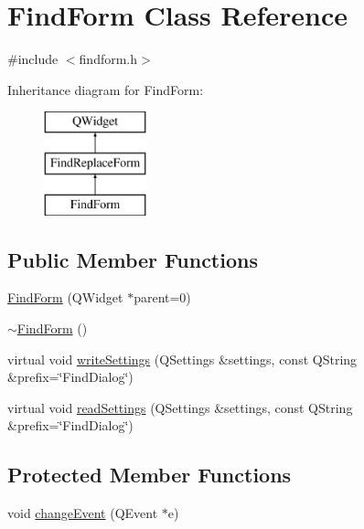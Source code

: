 \hypertarget{class_find_form}{}\section{Find\+Form Class Reference}
\label{class_find_form}


{\ttfamily \#include $<$findform.\+h$>$}

Inheritance diagram for Find\+Form\+:\begin{figure}[H]
\begin{center}
\leavevmode
\includegraphics[height=3.000000cm]{class_find_form}
\end{center}
\end{figure}
\subsection*{Public Member Functions}
\begin{DoxyCompactItemize}
\item 
\hyperlink{class_find_form_abcd5a2ae0b7d642134927bcef687410f}{Find\+Form} (Q\+Widget $\ast$parent=0)
\item 
\hyperlink{class_find_form_a79950e64527805f37728704eb5577a15}{$\sim$\+Find\+Form} ()
\item 
virtual void \hyperlink{class_find_form_a8d9f1b06d14a58d2d2a91d1d82205b4d}{write\+Settings} (Q\+Settings \&settings, const Q\+String \&prefix=\char`\"{}Find\+Dialog\char`\"{})
\item 
virtual void \hyperlink{class_find_form_abfa26fe2e262103bbd9d694e748c0884}{read\+Settings} (Q\+Settings \&settings, const Q\+String \&prefix=\char`\"{}Find\+Dialog\char`\"{})
\end{DoxyCompactItemize}
\subsection*{Protected Member Functions}
\begin{DoxyCompactItemize}
\item 
void \hyperlink{class_find_form_aa1ee766531453cc558ff1a8efbfd9bf6}{change\+Event} (Q\+Event $\ast$e)
\end{DoxyCompactItemize}
